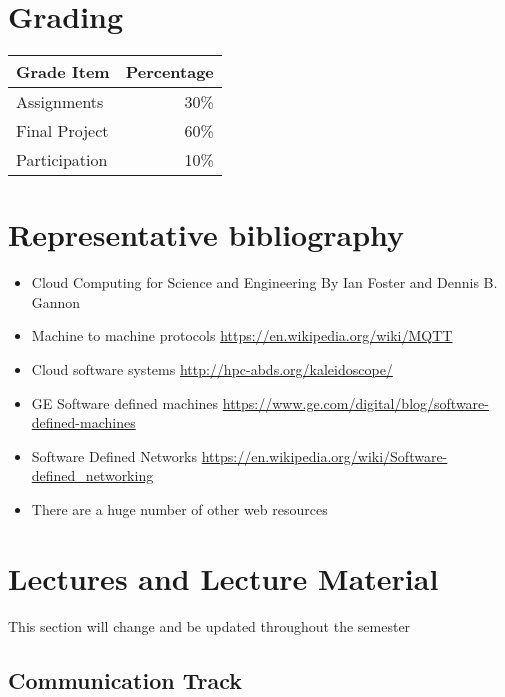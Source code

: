 \begin{itemize}
\section{Grading}


\begin{tabular}{lr}
Grade Item	  & Percentage\\
\hline
Assignments	  & 30\% \\
Final Project	& 60\% \\
Participation	& 10\% \\
\hline
\end{tabular}



\section{Representative bibliography}

\begin{itemize}
\item Cloud Computing for Science and Engineering By Ian Foster and
  Dennis
  B. Gannon
\item	Machine to machine protocols \url{https://en.wikipedia.org/wiki/MQTT}
\item	Cloud software systems \url{http://hpc-abds.org/kaleidoscope/}
\item	GE Software defined machines \url{https://www.ge.com/digital/blog/software-defined-machines}
\item	Software Defined Networks \url{https://en.wikipedia.org/wiki/Software-defined_networking}
\item	There are a huge number of other web resources
\end{itemize}

\section{Lectures and Lecture Material}

\begin{WARNING}
This section will change and be updated throughout the semester
\end{WARNING}

\subsection{Communication Track}



\end{itemize}
